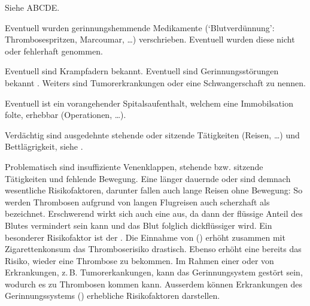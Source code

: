 {{\TxSAMPLER}}
{
\begin{SAMPLERText}
  \item[\SAMPLER{S}] Siehe ABCDE.
  \item[\SAMPLER{M}] Eventuell wurden gerinnungshemmende
  Medikamente (\enquote*{Blutverdünnung}:
  Thrombosespritzen, Marcoumar{\texttrademark}, \ldots)
  verschrieben. Eventuell wurden diese nicht oder fehlerhaft
  genommen.
  \item[\SAMPLER{P}] Eventuell sind Krampfadern
   bekannt. Eventuell
  sind Gerinnungsstörungen bekannt . Weiters sind
  Tumorerkrankungen oder eine Schwangerschaft zu nennen.
  \item[\SAMPLER{L}] Eventuell ist ein vorangehender
  Spitalsaufenthalt, welchem eine Immobilsation folte,
  erhebbar (Operationen, \ldots).
  \item[\SAMPLER{E}] Verdächtig sind ausgedehnte stehende
  oder sitzende Tätigkeiten (Reisen, \ldots) und
  Bettlägrigkeit, siehe {}.
  \item[\SAMPLER{R}]
  Problematisch sind insuffiziente Venenklappen, stehende bzw. sitzende
  Tätigkeiten und fehlende Bewegung.
  Eine länger dauernde  oder
   sind demnach wesentliche
  Risikofaktoren,
  darunter fallen auch lange Reisen ohne Bewegung: So werden
  Thrombosen aufgrund von langen Flugreisen auch scherzhaft als  bezeichnet.
  Erschwerend wirkt sich auch eine  aus, da dann der flüssige Anteil des
  Blutes vermindert sein kann und das Blut folglich
  dickflüssiger wird.
  Ein besonderer Risikofaktor ist der
  .
  Die Einnahme von 
  () erhöht zusammen mit
  Zigarettenkonsum das Thromboserisiko drastisch.
  Ebenso erhöht eine bereits  das Risiko, wieder eine Thrombose zu bekommen.
  Im Rahmen einer
   oder von
  Erkrankungen, z.\,B.
  Tumorerkankungen, kann das Gerinnungsystem gestört sein, wodurch es zu Thrombosen
  kommen kann. Ausserdem können Erkrankungen des
  Gerinnungssystems ()  erhebliche
  Risikofaktoren darstellen.
\end{SAMPLERText}
}
{
\begin{SAMPLERSlide}
  \item[\SAMPLER{S}]
  \item[\SAMPLER{A}]
  \item[\SAMPLER{M}] 
  \item[\SAMPLER{P}] 
  \item[\SAMPLER{L}]
  \item[\SAMPLER{E}] 
  \item[\SAMPLER{R}]
\end{SAMPLERSlide}
}
{}
{}
{}

